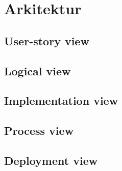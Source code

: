 \chapter{Arkitektur}


\lipsum[2]

\section{User-story view}

\section{Logical view}

\section{Implementation view} %

\section{Process view}

\section{Deployment view} %

